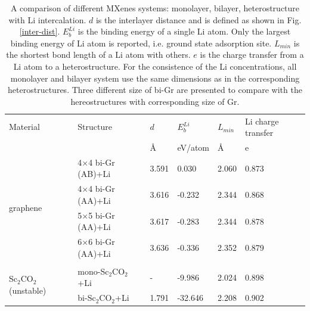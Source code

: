 \begin{table}[ht]
\centering
\caption{A comparison of different MXenes systems: monolayer, bilayer, heterostructure with Li intercalation. $d$ is the interlayer distance and is defined as shown in Fig. \ref{inter-dist}. $E_b^{Li}$ is the binding energy of a single Li atom. Only the largest binding energy of Li atom is reported, i.e. ground state adsorption site. $L_{min}$ is the shortest bond length of a Li atom with others. $e$ is the charge transfer from a Li atom to a heterostructure. For the consistence of the Li concentrations, all monolayer and bilayer system use the same dimensions as in the corresponding heterostructures. Three different size of bi-Gr are presented to compare with the hereostructures with corresponding size of Gr.} 
\label{my-label}
\begin{tabularx}{\textwidth}{XXXXXX}
\hline
Material      & Structure                         & $d$                & $E_b^{Li}$               & $L_{min}$ & Li charge transfer   \\
              &                                   & \AA                       & eV/atom                             & \AA                       & e                \\ \hline
\multirow{4}{*}{graphene}      & 4$\times$4 bi-Gr (AB)+Li                 & 3.591                    & 0.030                          & 2.060                     & 0.873                        \\
              & 4$\times$4 bi-Gr (AA)+Li                 & 3.616                                                                            & -0.232                         & 2.344                     & 0.868                        \\
              & 5$\times$5 bi-Gr (AA)+Li                  & 3.617                                                                          & -0.283                         & 2.344                     & 0.878                        \\
              & 6$\times$6 bi-Gr (AA)+Li                  & 3.636                                                                         & -0.336                         & 2.352                     & 0.879                        \\ 
& & & & \\              
\multirow{3}{*}{Sc$_2$CO$_2$ (unstable)}    & mono-Sc$_2$CO$_2$+Li  & -  & -9.986  & 2.024  & 0.898 \\
              & bi-Sc$_2$CO$_2$+Li   & 1.791              & -32.646 & 2.208  & 0.902 \\

\end{tabularx}
\end{table}
